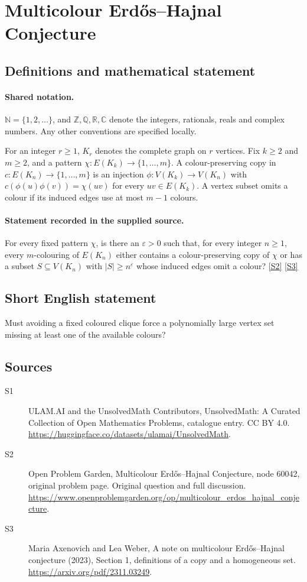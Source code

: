 \documentclass[11pt]{article}
\newcommand{\sref}[2]{\hyperlink{source:#1:#2}{[S#2]}}
\begin{document}
\section{Multicolour Erdős--Hajnal Conjecture}\label{statement}

\subsection{Definitions and mathematical statement}

\paragraph{Shared notation.}$\mathbb N=\{1,2,\ldots\}$, and $\mathbb Z,\mathbb Q,\mathbb R,\mathbb C$ denote the integers, rationals, reals and complex numbers. Any other conventions are specified locally.


For an integer $r\geq1$, $K_r$ denotes the complete graph on $r$ vertices. Fix $k\geq2$ and $m\geq2$, and a pattern $\chi:E(K_k)\to\{1,\ldots,m\}$. A colour-preserving copy in $c:E(K_n)\to\{1,\ldots,m\}$ is an injection $\phi:V(K_k)\to V(K_n)$ with $c(\phi(u)\phi(v))=\chi(uv)$ for every $uv\in E(K_k)$. A vertex subset omits a colour if its induced edges use at most $m-1$ colours.
\paragraph{Statement recorded in the supplied source.}
For every fixed pattern $\chi$, is there an $\varepsilon>0$ such that, for every integer $n\geq1$, every $m$-colouring of $E(K_n)$ either contains a colour-preserving copy of $\chi$ or has a subset $S\subseteq V(K_n)$ with $|S|\geq n^\varepsilon$ whose induced edges omit a colour? \sref{statement}{2} \sref{statement}{3}
\subsection{Short English statement}
Must avoiding a fixed coloured clique force a polynomially large vertex set missing at least one of the available colours?
\subsection{Sources}
\begin{description}
\item[\hypertarget{source:statement:1}{S1}] ULAM.AI and the UnsolvedMath Contributors, UnsolvedMath: A Curated Collection of Open Mathematics Problems, catalogue entry. CC BY 4.0. \url{https://huggingface.co/datasets/ulamai/UnsolvedMath}.
\item[\hypertarget{source:statement:2}{S2}] Open Problem Garden, Multicolour Erdős--Hajnal Conjecture, node 60042, original problem page. Original question and full discussion. \url{https://www.openproblemgarden.org/op/multicolour_erdos_hajnal_conjecture}.
\item[\hypertarget{source:statement:3}{S3}] Maria Axenovich and Lea Weber, A note on multicolour Erdős--Hajnal conjecture (2023), Section 1, definitions of a copy and a homogeneous set. \url{https://arxiv.org/pdf/2311.03249}.
\end{description}
\label{end:statement}
\end{document}
